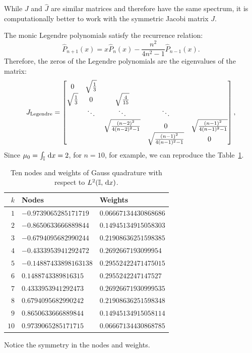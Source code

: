 \begin{remark}
While $J$ and $\hat{J}$ are similar matrices and therefore have the same spectrum, it is computationally better to work with the symmetric Jacobi matrix $J$.
\end{remark}

\begin{example}
The monic Legendre polynomials satisfy the recurrence relation:
\[
\hat{P}_{n+1}(x) = x\hat{P}_n(x) - \dfrac{n^2}{4n^2-1}\hat{P}_{n-1}(x).
\]
Therefore, the zeros of the Legendre polynomials are the eigenvalues of the matrix:
\[
J_{\rm Legendre} =  \begin{bmatrix}
0 & \sqrt{\tfrac{1}{3}}\\
\sqrt{\tfrac{1}{3}} & 0 & \sqrt{\tfrac{4}{15}}\\
& \ddots & \ddots & \ddots\\
& & \sqrt{\tfrac{(n-2)^2}{4(n-2)^2-1}} & 0 & \sqrt{\tfrac{(n-1)^2}{4(n-1)^2-1}}\\
& & & \sqrt{\tfrac{(n-1)^2}{4(n-1)^2-1}} & 0\\
\end{bmatrix},
\]
Since $\mu_0 = \int_{\mathbb{I}}{\rm\,d} x = 2$, for $n=10$, for example, we can reproduce the Table~\ref{table:GaussLegendre}.
\begin{table}[htp]
\caption{Ten nodes and weights of Gauss quadrature with respect to $L^2(\mathbb{I},{\rm\,d} x)$.}
\begin{center}
\begin{tabular}{rll}
\hline
$k$ & Nodes & Weights\\
\hline
$1$ & $-0.9739065285171719$ & $0.06667134430868686$\\
$2$ & $-0.8650633666889844$ & $0.14945134915058303$\\
$3$ & $-0.6794095682990244$ & $0.21908636251598385$\\
$4$ & $-0.4333953941292472$ & $0.2692667193099954$\\
$5$ & $-0.14887433898163138$ & $0.29552422471475015$\\
$6$ & $0.1488743389816315$ & $0.2955242247147527$\\
$7$ & $0.4333953941292473$ & $0.26926671930999535$\\
$8$ & $0.6794095682990242$ & $0.21908636251598348$\\
$9$ & $0.8650633666889844$ & $0.14945134915058114$\\
$10$ & $0.9739065285171715$ &  $0.06667134430868785$\\
\hline
\end{tabular}
\end{center}
\label{table:GaussLegendre}
\end{table}%
Notice the symmetry in the nodes and weights.
\end{example}

